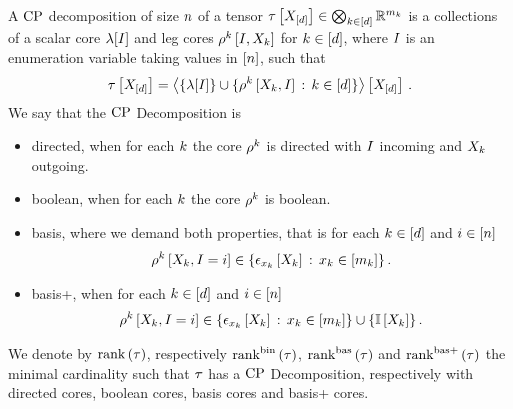 \begin{definition}
    \label{def:cpFormats}
    A $\mathrm{CP}$ decomposition of size $n$ of a tensor $ \tau\left[X_{[d]}\right]\in\bigotimes_{k\in[d]} \mathbb{R}^{m_{k}}$ is a collections of a scalar core $\lambda[I]$ and leg cores $\rho^{k}\left[I,X_{k}\right]$ for $k\in[d]$, where $I$ is an enumeration variable taking values in $[n]$, such that
    \begin{align*}
        \tau\left[X_{[d]}\right]
        = \left\langle 
            \{\lambda[I]\} \cup \{ \rho^{k}\left[X_{k},I\right] \,:\, k\in[d] \}
        \right\rangle \left[ X_{[d]} \right] \, .
    \end{align*}
    We say that the $\mathrm{CP}$ Decomposition is
    \begin{itemize}
        \item directed, when for each $k$ the core $\rho^{k}$ is directed with $I$ incoming and $X_{k}$ outgoing.
        \item boolean, when for each $k$ the core $\rho^{k}$ is boolean.
        \item basis, where we demand both properties, that is for each $k\in[d]$ and $i\in[n]$
        \begin{align*}
            \rho^{k}\left[X_{k},I=i\right]
            \in\{\epsilon_{x_{k}}\left[X_{k}\right] \,:\, x_{k}\in[m_{k}] \}\, .
        \end{align*}
        \item basis+, when for each $k\in[d]$ and $i\in[n]$  %
        \begin{align*}
            \rho^{k}\left[X_{k},I=i\right]
            \in\{\epsilon_{x_{k}}\left[X_{k}\right] \,:\, x_{k}\in[m_{k}] \} \cup \{\mathbb{I}\left[X_{k}\right]\}\, .
        \end{align*}
    \end{itemize}
    We denote by $\mathrm{rank}\left(\tau\right)$, respectively $\mathrm{rank}^{\mathrm{bin}}\left(\tau\right)$, $\mathrm{rank}^{\mathrm{bas}}\left(\tau\right)$ and $\mathrm{rank}^{\mathrm{bas+}}\left(\tau\right)$ the minimal cardinality such that $\tau$ has a $\mathrm{CP}$ Decomposition, respectively with directed cores, boolean cores, basis cores and basis+ cores.
\end{definition}

